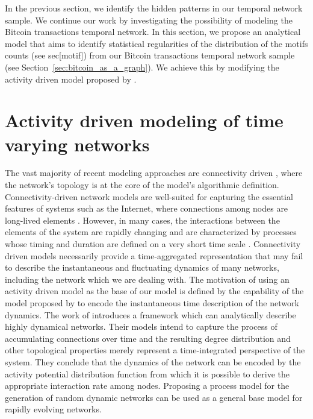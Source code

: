 \documentclass[../../thesis.tex]{subfiles}
\begin{document}
In the previous section, we identify the hidden patterns in our temporal network sample. We continue our work by investigating the possibility of modeling the Bitcoin transactions temporal network. In this section, we propose an analytical model that aims to identify statistical regularities of the distribution of the motifs counts (see sec[motif]) from our Bitcoin transactions temporal network sample (see Section~\ref{sec:bitcoin_as_a_graph}). We achieve this by modifying the activity driven model proposed by \cite{perra2012activity}. 



\section{Activity driven modeling of time varying networks}
\label{sec:activity_driven_model}

The vast majority of recent modeling approaches are connectivity driven \cite{1newman2010networks,2barrat2008dynamical,3albert2002statistical,4boccaletti2006complex,5bollobas2013modern,6vespignani2012modelling,8molloy1995critical,9holland1981exponential,10frank1986markov,11wasserman1996logit,12barabasi1999mean,13barabasi1999emergence,14dorogovtsev2000structure,15dorogovtsev2013evolution,16fortunato2006scale,17boguna2003class}, where the network’s topology is at the core of the model’s algorithmic definition. Connectivity-driven network models are well-suited for capturing the essential features of systems such as the Internet, where connections among nodes are long-lived elements \cite{18pastor2007evolution,19albert1999internet}. However, in many cases, the interactions between the elements of the system are rapidly changing and are characterized by processes whose timing and duration are defined on a very short time scale \cite{temporalNetworks,21ghoshal2006attractiveness}. Connectivity driven models necessarily provide a time-aggregated representation that may fail to describe the instantaneous and fluctuating dynamics of many networks, including the network which we are dealing with. The motivation of using an activity driven model as the base of our model is defined by the capability of the model proposed by \cite{perra2012activity} to encode the instantaneous time description of the network dynamics.  The work of \cite{perra2012activity} introduces a framework which can analytically describe highly dynamical networks. Their models intend to capture the process of accumulating connections over time and the resulting degree distribution and other topological properties merely represent a time-integrated perspective of the system. They conclude that the dynamics of the network can be encoded by the activity potential distribution function from which it is possible to derive the appropriate interaction rate among nodes. Proposing a process model for the generation of random dynamic networks can be used as a general base model for rapidly evolving networks.
\end{document}

